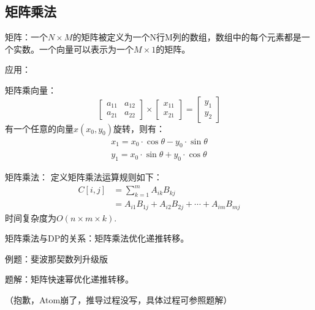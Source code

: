 \documentclass{article}
\begin{document}
\subsection{矩阵乘法}
矩阵：一个$N\times M$的矩阵被定义为一个N行M列的数组，数组中的每个元素都是一个实数。一个向量可以表示为一个$M\times 1$的矩阵。

应用：

矩阵乘向量：
\begin{equation*}
    \begin{bmatrix}
        a_{11}&a_{12}\\
        a_{21}&a_{22}
    \end{bmatrix}
    \times
    \begin{bmatrix}
        x_{11}\\
        x_{21}
    \end{bmatrix}
    =
    \begin{bmatrix}
        y_1\\
        y_2
    \end{bmatrix}
\end{equation*}
有一个任意的向量$x(x_0,y_0)$旋转\theta\textdegree，则有：
\begin{equation*}
    \begin{aligned}
        x_1=x_0\cdot\cos\theta-y_0\cdot\sin\theta\\
        y_1=x_0\cdot\sin\theta+y_0\cdot\cos\theta
    \end{aligned}
\end{equation*}

矩阵乘法：
定义矩阵乘法运算规则如下：
\begin{equation*}
    \begin{aligned}
        C[i,j]&=\sum_{k=1}^m A_{ik}B_{kj}\\
        &=A_{i1}B_{1j}+A_{i2}B_{2j}+\cdots +A_{im}B_{mj}
    \end{aligned}
\end{equation*}
时间复杂度为$O(n\times m\times k)$.

矩阵乘法与DP的关系：矩阵乘法优化递推转移。

例题：斐波那契数列升级版

题解：矩阵快速幂优化递推转移。

（抱歉，Atom崩了，推导过程没写，具体过程可参照题解）
\end{document}

